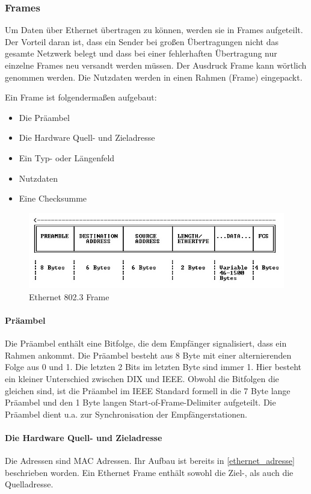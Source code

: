 \documentclass[12pt, a4paper, ngerman]{article}
\begin{document}
 \subsubsection{Frames}
Um Daten über Ethernet übertragen zu können, werden sie in Frames aufgeteilt. Der Vorteil daran ist, dass ein Sender bei großen Übertragungen nicht das gesamte Netzwerk belegt und dass bei einer fehlerhaften Übertragung nur einzelne Frames neu versandt werden müssen. Der Ausdruck Frame kann wörtlich genommen werden. Die Nutzdaten werden in einen Rahmen (Frame) eingepackt.

Ein Frame ist folgendermaßen aufgebaut:
\begin{itemize}
	\item Die Präambel 
	\item Die Hardware Quell- und Zieladresse
	\item Ein Typ- oder Längenfeld
	\item Nutzdaten
	\item Eine Checksumme
\end{itemize}
\begin{figure}[H]
	\centering
	\includegraphics[width=0.9\linewidth]{Grafiken/ethernet_frame.jpg}
	\caption{Ethernet 802.3 Frame \cite{ethernet_frame}}
	\label{ethernet_frame}
\end{figure}

\paragraph{Präambel \label{ethernet_praeambel}}
Die Präambel enthält eine Bitfolge, die dem Empfänger signalisiert, dass ein Rahmen ankommt. Die Präambel besteht aus 8 Byte mit einer alternierenden Folge aus 0 und 1. Die letzten 2 Bits im letzten Byte sind immer 1. Hier besteht ein kleiner Unterschied zwischen DIX und IEEE. Obwohl die Bitfolgen die gleichen sind, ist die Präambel im IEEE Standard formell in die 7 Byte lange Präambel und den 1 Byte langen Start-of-Frame-Delimiter aufgeteilt.
Die Präambel dient u.a. zur Synchronisation der Empfängerstationen. 

\paragraph{ Die Hardware Quell- und Zieladresse}
Die Adressen sind MAC Adressen. Ihr Aufbau ist bereits in \ref{ethernet_adresse} beschrieben worden. Ein Ethernet Frame enthält sowohl die Ziel-, als auch die Quelladresse.
\end{document}

